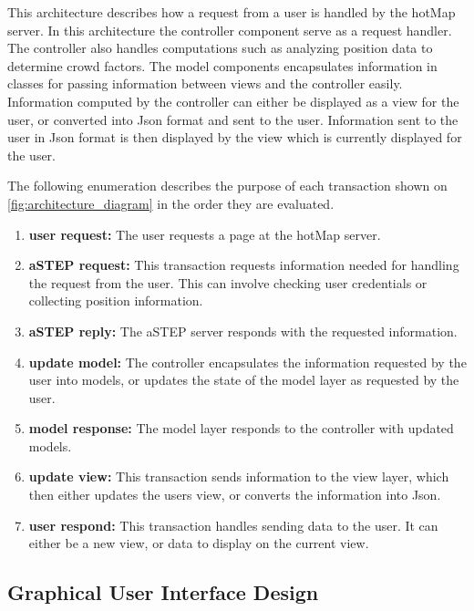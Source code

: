 
This architecture describes how a request from a user is handled by the hotMap server. In this architecture the controller component serve as a request handler. The controller also handles computations such as analyzing position data to determine crowd factors. The model components encapsulates information in classes for passing information between views and the controller easily. Information computed by the controller can either be displayed as a view for the user, or converted into Json format and sent to the user. Information sent to the user in Json format is then displayed by the view which is currently displayed for the user.


The following enumeration describes the purpose of each transaction shown on \cref{fig:architecture_diagram} in the order they are evaluated.

\begin{enumerate}
    \item \textbf{user request:} The user requests a page at the hotMap server.
    \item \textbf{aSTEP request:} This transaction requests information needed for handling the request from the user. This can involve checking user credentials or collecting position information.
    \item \textbf{aSTEP reply:} The aSTEP server responds with the requested information.
    \item \textbf{update model:} The controller encapsulates the information requested by the user into models, or updates the state of the model layer as requested by the user.
    \item \textbf{model response:} The model layer responds to the controller with updated models.
    \item \textbf{update view:} This transaction sends information to the view layer, which then either updates the users view, or converts the information into Json.
    \item \textbf{user respond:} This transaction handles sending data to the user. It can either be a new view, or data to display on the current view.
\end{enumerate}


\subsection{Graphical User Interface Design} \label{sec:s2_gui}

